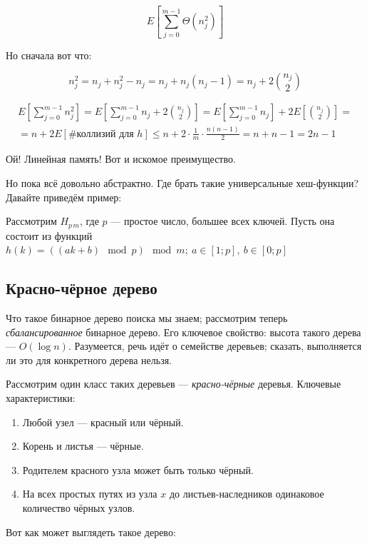 \[
    E\left[ \sum\limits_{j=0}^{m-1} \Theta(n_j^2) \right]
\]

Но сначала вот что:

\[
    n_j^2 = n_j +n_j^2 - n_j = n_j+n_j(n_j-1) = n_j + 2{n_j \choose 2}
\]

\begin{multline*}
    E\left[ \sum\limits_{j=0}^{m-1} n_j^2 \right] = 
    E\left[ \sum\limits_{j=0}^{m-1} n_j + 2{n_j \choose 2} \right] = 
    E\left[ \sum\limits_{j=0}^{m-1} n_j \right] + 2E\left[{n_j \choose 2} \right] = \\ =
    n + 2E\left[ \text{\# коллизий для $h$} \right] \leqslant
    n + 2\cdot\frac{1}{m}\cdot\frac{n(n-1)}{2} =
    n + n - 1 =
    2n - 1
\end{multline*}

Ой! Линейная память! Вот и искомое преимущество.

Но пока всё довольно абстрактно. Где брать такие универсальные хеш-функции? Давайте приведём пример:

Рассмотрим $H_{p\, m}$, где $p$ --- простое число, большее всех ключей.
Пусть она состоит из функций $h(k) = \left( \left( ak+b \right)\mod{p} \right)\mod{m};\ a\in[1;p],\ b\in[0; p]$

\subsection{Красно-чёрное дерево}

Что такое бинарное дерево поиска мы знаем; рассмотрим теперь \emph{сбалансированное} бинарное дерево. Его ключевое свойство: высота такого дерева --- $O(\log n)$. Разумеется, речь идёт о семействе деревьев; сказать, выполняется ли это для конкретного дерева нельзя.

Рассмотрим один класс таких деревьев --- \emph{красно-чёрные} деревья. Ключевые характеристики:

\begin{enumerate}
    \item Любой узел --- красный или чёрный.
    \item Корень и листья --- чёрные.
    \item Родителем красного узла может быть только чёрный.
    \item На всех простых путях из узла $x$ до листьев-наследников одинаковое количество чёрных узлов.
\end{enumerate}

Вот как может выглядеть такое дерево:

